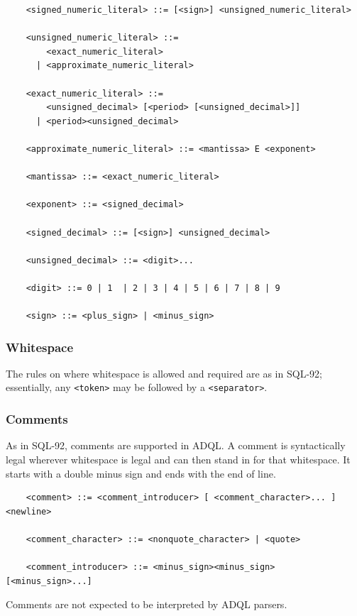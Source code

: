 \documentclass[11pt,a4paper]{ivoa}
\begin{document}
\begin{verbatim}
    <signed_numeric_literal> ::= [<sign>] <unsigned_numeric_literal>

    <unsigned_numeric_literal> ::=
        <exact_numeric_literal>
      | <approximate_numeric_literal>

    <exact_numeric_literal> ::=
        <unsigned_decimal> [<period> [<unsigned_decimal>]]
      | <period><unsigned_decimal>

    <approximate_numeric_literal> ::= <mantissa> E <exponent>

    <mantissa> ::= <exact_numeric_literal>

    <exponent> ::= <signed_decimal>

    <signed_decimal> ::= [<sign>] <unsigned_decimal>

    <unsigned_decimal> ::= <digit>...

    <digit> ::= 0 | 1  | 2 | 3 | 4 | 5 | 6 | 7 | 8 | 9

    <sign> ::= <plus_sign> | <minus_sign>
\end{verbatim}

\subsubsection{Whitespace}
\label{sec:whitespace}

The rules on where whitespace is allowed and required are as in SQL-92;
essentially, any \verb:<token>: may be followed by a \verb:<separator>:.

\subsubsection{Comments}
\label{sec:comments}

As in SQL-92, comments are supported in ADQL. A comment is syntactically legal
wherever whitespace is legal and can then stand in for that whitespace. It
starts with a double minus sign and ends with the end of line.

\begin{verbatim}
    <comment> ::= <comment_introducer> [ <comment_character>... ] <newline>

    <comment_character> ::= <nonquote_character> | <quote>

    <comment_introducer> ::= <minus_sign><minus_sign> [<minus_sign>...]
\end{verbatim}

Comments are not expected to be interpreted by ADQL parsers.
\end{document}
